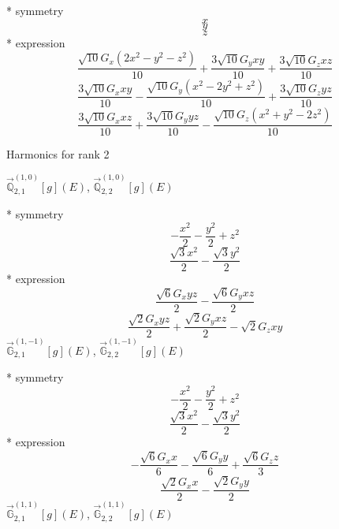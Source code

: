 \documentclass[fleqn,8pt]{jsarticle}
\begin{document}
\noindent\quad ** symmetry
\begin{dmath*}
x
\end{dmath*}
\begin{dmath*}
y
\end{dmath*}
\begin{dmath*}
z
\end{dmath*}
\noindent\quad ** expression
\begin{dmath*}
\frac{\sqrt{10} G_{x} \left(2 x^{2} - y^{2} - z^{2}\right)}{10} + \frac{3 \sqrt{10} G_{y} x y}{10} + \frac{3 \sqrt{10} G_{z} x z}{10}
\end{dmath*}
\begin{dmath*}
\frac{3 \sqrt{10} G_{x} x y}{10} - \frac{\sqrt{10} G_{y} \left(x^{2} - 2 y^{2} + z^{2}\right)}{10} + \frac{3 \sqrt{10} G_{z} y z}{10}
\end{dmath*}
\begin{dmath*}
\frac{3 \sqrt{10} G_{x} x z}{10} + \frac{3 \sqrt{10} G_{y} y z}{10} - \frac{\sqrt{10} G_{z} \left(x^{2} + y^{2} - 2 z^{2}\right)}{10}
\end{dmath*}

\noindent * Harmonics for rank 2

\noindent\quad $\vec{\mathbb{Q}}_{2,1}^{(1,0)}[g](E)$, $\vec{\mathbb{Q}}_{2,2}^{(1,0)}[g](E)$

\noindent\quad ** symmetry
\begin{dmath*}
- \frac{x^{2}}{2} - \frac{y^{2}}{2} + z^{2}
\end{dmath*}
\begin{dmath*}
\frac{\sqrt{3} x^{2}}{2} - \frac{\sqrt{3} y^{2}}{2}
\end{dmath*}
\noindent\quad ** expression
\begin{dmath*}
\frac{\sqrt{6} G_{x} y z}{2} - \frac{\sqrt{6} G_{y} x z}{2}
\end{dmath*}
\begin{dmath*}
\frac{\sqrt{2} G_{x} y z}{2} + \frac{\sqrt{2} G_{y} x z}{2} - \sqrt{2} G_{z} x y
\end{dmath*}
\noindent\quad $\vec{\mathbb{G}}_{2,1}^{(1,-1)}[g](E)$, $\vec{\mathbb{G}}_{2,2}^{(1,-1)}[g](E)$

\noindent\quad ** symmetry
\begin{dmath*}
- \frac{x^{2}}{2} - \frac{y^{2}}{2} + z^{2}
\end{dmath*}
\begin{dmath*}
\frac{\sqrt{3} x^{2}}{2} - \frac{\sqrt{3} y^{2}}{2}
\end{dmath*}
\noindent\quad ** expression
\begin{dmath*}
- \frac{\sqrt{6} G_{x} x}{6} - \frac{\sqrt{6} G_{y} y}{6} + \frac{\sqrt{6} G_{z} z}{3}
\end{dmath*}
\begin{dmath*}
\frac{\sqrt{2} G_{x} x}{2} - \frac{\sqrt{2} G_{y} y}{2}
\end{dmath*}
\noindent\quad $\vec{\mathbb{G}}_{2,1}^{(1,1)}[g](E)$, $\vec{\mathbb{G}}_{2,2}^{(1,1)}[g](E)$
\end{document}
